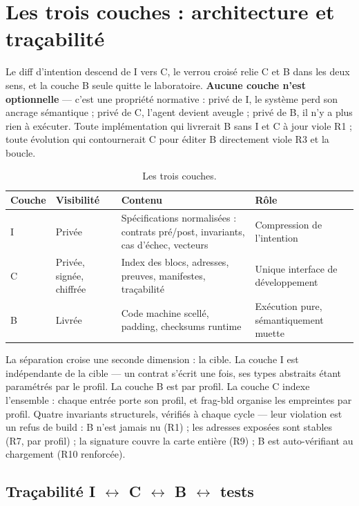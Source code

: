 \section{Les trois couches : architecture et traçabilité}\label{sec:couches}

Le diff d’intention descend de I vers C, le verrou croisé relie C et B dans les deux sens,
et la couche B seule quitte le laboratoire. \textbf{Aucune couche n’est optionnelle} —
c’est une propriété normative : privé de I, le système perd son ancrage sémantique ; privé
de C, l’agent devient aveugle ; privé de B, il n’y a plus rien à exécuter. Toute
implémentation qui livrerait B sans I et C à jour viole R1 ; toute évolution qui
contournerait C pour éditer B directement viole R3 et la boucle.

\begin{table}[htbp]
\centering\small
\caption{Les trois couches.}
\label{tab:couches}
\begin{tabularx}{\textwidth}{@{}l l Y Y@{}}
\toprule
\textbf{Couche} & \textbf{Visibilité} & \textbf{Contenu} & \textbf{Rôle} \\
\midrule
I & Privée & Spécifications normalisées : contrats pré/post, invariants, cas d’échec,
vecteurs & Compression de l’intention \\
C & Privée, signée, chiffrée & Index des blocs, adresses, preuves, manifestes,
traçabilité & Unique interface de développement \\
B & Livrée & Code machine scellé, padding, checksums runtime & Exécution pure,
sémantiquement muette \\
\bottomrule
\end{tabularx}
\end{table}

La séparation croise une seconde dimension : la cible. La couche I est indépendante de la
cible — un contrat s’écrit une fois, ses types abstraits étant paramétrés par le profil.
La couche B est par profil. La couche C indexe l’ensemble : chaque entrée porte son
profil, et frag-bld organise les empreintes par profil. Quatre invariants structurels,
vérifiés à chaque cycle — leur violation est un refus de build : B n’est jamais nu (R1) ;
les adresses exposées sont stables (R7, par profil) ; la signature couvre la carte entière
(R9) ; B est auto-vérifiant au chargement (R10 renforcée).

\subsection{Traçabilité I $\leftrightarrow$ C $\leftrightarrow$ B $\leftrightarrow$
tests}\label{sec:traceabilite}

